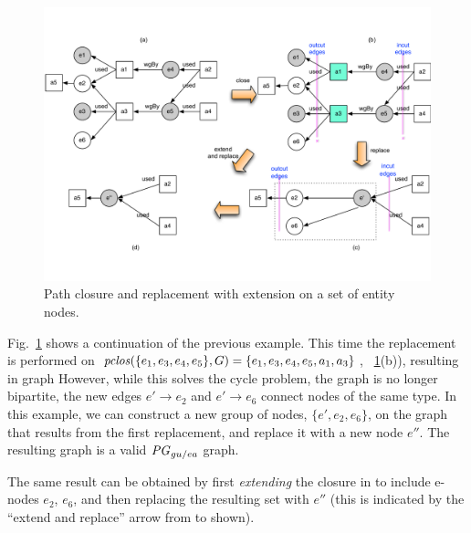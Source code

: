 



\begin{figure}
\centering
\includegraphics[scale=.5]{figures/convex-ex-1-revision.pdf} 
\caption{Path closure and replacement with extension on a set of entity nodes.} \label{fig:convex-ex-1}
\end{figure}

Fig.~\ref{fig:convex-ex-1} shows a continuation of the previous example. This time the replacement is performed on $\mathit{pclos}(\{e_1, e_3, e_4, e_5\},G) = \{e_1, e_3, e_4, e_5, a_1, a_3\}$, ~\ref{fig:convex-ex-1}(b)),  resulting in graph 
%
However, while this solves the cycle problem, the graph is no longer bipartite,  the new edges $e' \rightarrow e_2$ and $e' \rightarrow e_6$ connect nodes of the same type.
%
In this example, we can construct a new group of nodes, $\{ e', e_2, e_6\}$, on the graph that results from the first replacement, and replace it with a new node $e''$. The resulting graph  is a valid $\mathit{PG}_{gu/ea}$ graph.

%
The same result can be obtained by first \textit{extending} the closure in  to include e-nodes $e_2$, $e_6$, and then replacing the resulting set with $e''$ (this is indicated by the ``extend and replace'' arrow from  to  shown).
%

